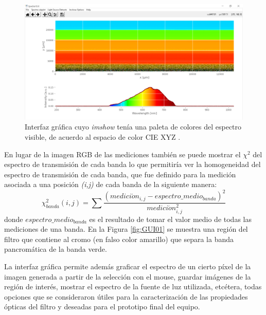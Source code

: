 \begin{figure}
	\centering
	\includegraphics[width=1.0\textwidth]{Figs/microespectrometro/guirgb.png}
	\caption{Interfaz gráfica cuyo \textit{imshow} tenía una paleta de colores del espectro visible, de acuerdo al espacio de color CIE XYZ \cite{Wyman}.}
	\label{fig:GUI00}
\end{figure}


En lugar de la imagen RGB de las mediciones también se puede mostrar el $\chi^{2}$ del espectro de transmisión de cada banda lo que permitiría ver la homogeneidad del espectro de transmisión de cada banda, que fue definido para la medición asociada a una posición \textit{(i,j)} de cada banda de la siguiente manera:
\begin{equation}
\chi^{2}_{banda}(i,j) = \sum \frac{(medici\acute{o}n_{i,j} - espectro\_medio_{banda})^{2}}{medici\acute{o}n^{2}_{i,j}}
\end{equation}
donde $espectro\_medio_{banda}$ es el resultado de tomar el valor medio de todas las mediciones de una banda. En la Figura \ref{fig:GUI01} se muestra una región del filtro que contiene al cromo (en falso color amarillo) que separa la banda pancromática de la banda verde. 

La interfaz gráfica permite además graficar el espectro de un cierto píxel de la imagen generada a partir de la selección con el mouse, guardar imágenes de la región de interés, mostrar el espectro de la fuente de luz utilizada, etcétera, todas opciones que se consideraron útiles para la caracterización de las propiedades ópticas del filtro y deseadas para el prototipo final del equipo.


